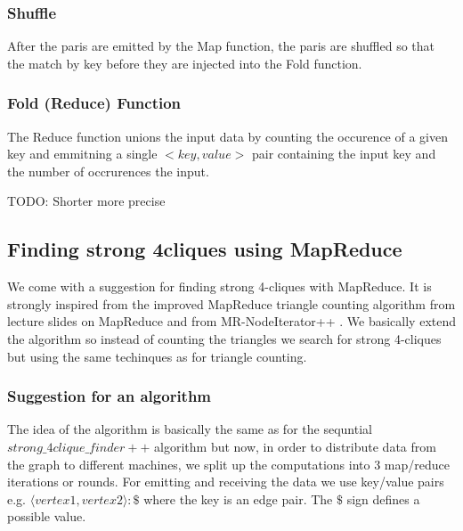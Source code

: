 \documentclass{article}
\begin{document}
\subsubsection{Shuffle}
After the paris are emitted by the Map function, the paris are shuffled so that the match by key before they are injected into the Fold function.

\subsubsection{Fold (Reduce) Function}
The Reduce function unions the input data by counting the occurence of a given key and emmitning a single $<key,value>$ pair containing the input key and the number of occrurences the input.

TODO: Shorter more precise

\subsection{Finding strong 4cliques using MapReduce}
We come with a suggestion for finding strong 4-cliques with MapReduce. It is strongly inspired from the improved MapReduce triangle counting algorithm from lecture slides on MapReduce \cite{lnMapReduce} and from MR-NodeIterator++ \cite{countingTriangles}. We basically extend the algorithm so instead of counting the triangles we search for strong 4-cliques but using the same techinques as for triangle counting.

\subsubsection{Suggestion for an algorithm}
The idea of the algorithm is basically the same as for the sequntial $strong\_4clique\_finder++$ algorithm but now, in order to distribute data from the graph to different machines, we split up the computations into 3 map/reduce iterations or rounds. For emitting and receiving the data we use key/value pairs e.g. $\langle vertex1,vertex2\rangle :\$$ where the key is an edge pair. The $\$$ sign defines a possible value.
\end{document}
